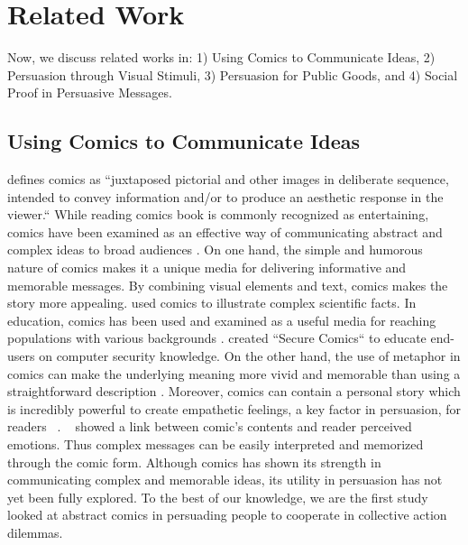 \section{Related Work}
\label{sec:relatedwork}
Now, we discuss related works in: 1) Using Comics to Communicate Ideas, 2) Persuasion through Visual Stimuli, 3) Persuasion for Public Goods, and 4) Social Proof in Persuasive Messages.

\subsection{Using Comics to Communicate Ideas}
\textcite{scott1993understanding} defines comics as ``juxtaposed pictorial and other images in deliberate sequence, intended to convey information and/or to produce an aesthetic response in the viewer.`` While reading comics book is commonly recognized as entertaining, comics have been examined as an effective way of communicating abstract and complex ideas to broad audiences \cite{McDermottPB18,cary2004going,scott1993understanding, Zhang-Kennedy:2017:SCI:3206217.3206282}. On one hand, the simple and humorous nature of comics makes it a unique media for delivering informative and memorable messages. By combining visual elements and text, comics makes the story more appealing. \textcite{McDermottPB18} used comics to illustrate complex scientific facts. In education, comics has been used and examined as a useful media for reaching populations with various backgrounds \cite{McDermottPB18,cary2004going,scott1993understanding}. \textcite{Zhang-Kennedy:2017:SCI:3206217.3206282} created ``Secure Comics`` to educate end-users on computer security knowledge. On the other hand, the use of metaphor in comics can make the underlying meaning more vivid and memorable than using a straightforward description \cite{McDermottPB18,scott1993understanding}. Moreover, comics can contain a personal story which is incredibly powerful to create empathetic feelings, a key factor in persuasion, for readers ~\cite{weaver2017losing}. ~\textcite{matsubara2016emotional} showed a link between comic's contents and reader perceived emotions. Thus complex messages can be easily interpreted and memorized through the comic form. Although comics has shown its strength in communicating complex and memorable ideas, its utility in persuasion has not yet been fully explored. To the best of our knowledge, we are the first study looked at abstract comics in persuading people to cooperate in collective action dilemmas.  

